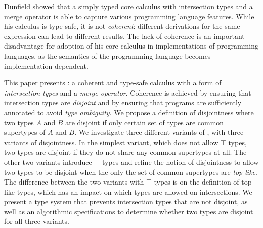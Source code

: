 Dunfield showed that a simply typed core calculus with intersection
types and a merge operator is able to capture various programming
language features. While his calculus is type-safe, it is not
\emph{coherent}: different derivations for the same expression can
lead to different results. The lack of coherence is an important
disadvantage for adoption of his core calculus in implementations of
programming languages, as the semantics of the programming language
becomes implementation-dependent.

This paper presents \name: a coherent and type-safe calculus with a
form of \emph{intersection types} and a \emph{merge
operator}. Coherence is achieved by ensuring that intersection types
are \emph{disjoint} and by ensuring that programs are sufficiently
annotated to avoid \emph{type ambiguity}. We propose a definition of disjointness where two
types $A$ and $B$ are disjoint if only certain set of types are common
supertypes of $A$ and $B$. We investigate three different variants of
\name, with three variants of disjointness. In the simplest
variant, which does not allow $\top$ types, two types are disjoint if
they do not share any common supertypes at all. The other two variants
introduce $\top$ types and refine the notion of disjointness to allow
two types to be disjoint when the only the set of common supertypes are
\emph{top-like}. The difference between the two variants with $\top$
types is on the definition of top-like types, which has an impact on
which types are allowed on intersections. We present a type system
that prevents intersection types that are not disjoint, as well as an
algorithmic specifications to determine whether two types are disjoint
for all three variants.